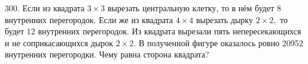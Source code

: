 300. Если из квадрата $3\times3$ вырезать центральную клетку, то в нём будет 8 внутренних перегородок. Если же из квадрата $4\times4$ вырезать дырку $2\times2,$ то будет 12 внутренних перегородок. Из квадрата вырезали пять непересекающихся и не соприкасающихся дырок $2\times2.$ В полученной фигуре оказалось ровно 20952 внутренних перегородки. Чему равна сторона квадрата?\\
